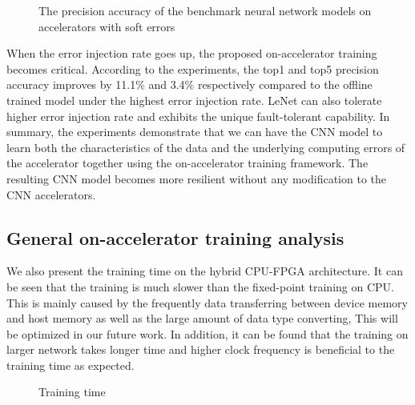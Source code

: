 \begin{figure}
        \center
        \qquad
        \qquad
        \qquad
        \caption{The precision accuracy of the benchmark neural network models on accelerators with soft errors}
        \label{fig:softerror accuracy}
\end{figure}

When the error injection rate goes up, the proposed on-accelerator training becomes critical. 
According to the experiments, the top1 and top5 precision accuracy improves by 11.1\% and 3.4\%
respectively compared to the offline trained model under the highest error injection rate. 
LeNet can also tolerate higher error injection rate and exhibits the unique fault-tolerant capability.
In summary, the experiments demonstrate that we can have the CNN model to learn 
both the characteristics of the data and the underlying computing errors of the accelerator 
together using the on-accelerator training framework. The resulting CNN model becomes more resilient 
without any modification to the CNN accelerators.  

\subsection{General on-accelerator training analysis}
We also present the training time on the hybrid CPU-FPGA architecture. 
It can be seen that the training is much slower than the fixed-point training on CPU. 
This is mainly caused by the frequently data transferring between device memory and host 
memory as well as the large amount of data type converting, This will be optimized 
in our future work. In addition, it can be found that the 
training on larger network takes longer time and higher clock frequency 
is beneficial to the training time as expected.  

\begin{figure}
        \caption{Training time}
        \label{fig:time}
\end{figure}


